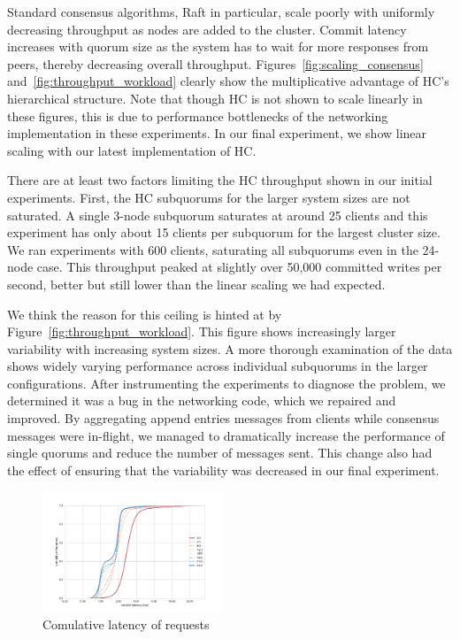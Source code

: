 \documentclass[11pt,conference]{IEEEtran}
\begin{document}
Standard consensus algorithms, Raft in particular, scale poorly with uniformly 
decreasing throughput as nodes are added to the cluster.
Commit latency increases with quorum size as the system has to wait for more responses 
from peers, thereby decreasing overall throughput.
Figures~\ref{fig:scaling_consensus} and~\ref{fig:throughput_workload} 
clearly show the multiplicative advantage of HC's hierarchical structure.
Note that though HC is not shown to scale linearly in these figures, this is due to 
performance bottlenecks of the networking implementation in these experiments.
In our final experiment, we show linear scaling with our latest implementation of HC.

There are at least two factors limiting the HC throughput shown in our initial experiments.
First, the HC subquorums for the larger system sizes are not saturated.
A single 3-node subquorum saturates at around 25 clients and this experiment has only 
about 15 clients per subquorum for the largest cluster size.
We ran experiments with 600 clients, saturating all subquorums even in the 24-node case.
This throughput peaked at slightly over 50,000 committed writes per second, better but 
still lower than the linear scaling we had expected.

We think the reason for this ceiling is hinted at by Figure~\ref{fig:throughput_workload}.
This figure shows increasingly larger variability with increasing system sizes.
A more thorough examination of the data shows widely varying performance across 
individual subquorums in the larger configurations.
After instrumenting the experiments to diagnose the problem, we determined it was a bug 
in the networking code, which we repaired and improved.
By aggregating append entries messages from clients while consensus messages were 
in-flight, we managed to dramatically increase the performance of single quorums and 
reduce the number of messages sent.
This change also had the effect of ensuring that the variability was decreased in our 
final experiment.

\begin{figure}
    \centering
    \includegraphics[width=0.48\textwidth]{figures/ec2_latency_cumfreq.pdf}
    \caption{Comulative latency of requests}
    \label{fig:latency}
\end{figure}
\end{document}
